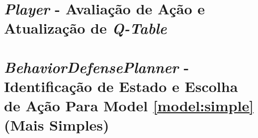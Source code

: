 \begin{apendicesenv}
    \chapter{\textit{Player} - Avaliação de Ação e Atualização de \textit{Q-Table}}

    \chapter{\textit{BehaviorDefensePlanner} - Identificação de Estado e Escolha de Ação Para Model \ref{model:simple} (Mais Simples)}
\end{apendicesenv}